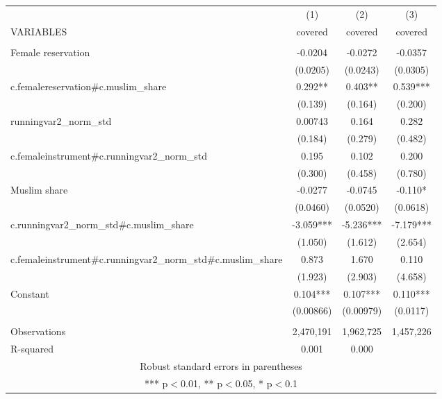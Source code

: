 \begin{tabular}{lccc} \hline
 & (1) & (2) & (3) \\
VARIABLES & covered & covered & covered \\ \hline
 &  &  &  \\
Female reservation & -0.0204 & -0.0272 & -0.0357 \\
 & (0.0205) & (0.0243) & (0.0305) \\
c.femalereservation\#c.muslim\_share & 0.292** & 0.403** & 0.539*** \\
 & (0.139) & (0.164) & (0.200) \\
runningvar2\_norm\_std & 0.00743 & 0.164 & 0.282 \\
 & (0.184) & (0.279) & (0.482) \\
c.femaleinstrument\#c.runningvar2\_norm\_std & 0.195 & 0.102 & 0.200 \\
 & (0.300) & (0.458) & (0.780) \\
Muslim share & -0.0277 & -0.0745 & -0.110* \\
 & (0.0460) & (0.0520) & (0.0618) \\
c.runningvar2\_norm\_std\#c.muslim\_share & -3.059*** & -5.236*** & -7.179*** \\
 & (1.050) & (1.612) & (2.654) \\
c.femaleinstrument\#c.runningvar2\_norm\_std\#c.muslim\_share & 0.873 & 1.670 & 0.110 \\
 & (1.923) & (2.903) & (4.658) \\
Constant & 0.104*** & 0.107*** & 0.110*** \\
 & (0.00866) & (0.00979) & (0.0117) \\
 &  &  &  \\
Observations & 2,470,191 & 1,962,725 & 1,457,226 \\
 R-squared & 0.001 & 0.000 &  \\ \hline
\multicolumn{4}{c}{ Robust standard errors in parentheses} \\
\multicolumn{4}{c}{ *** p$<$0.01, ** p$<$0.05, * p$<$0.1} \\
\end{tabular}
